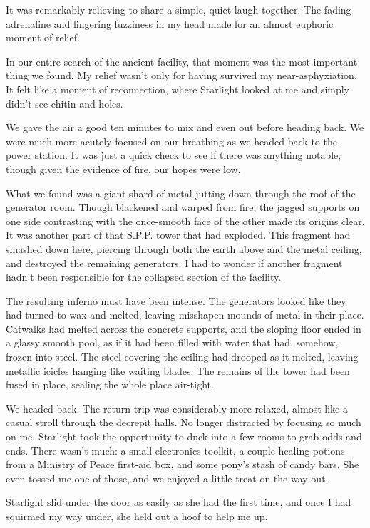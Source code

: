 It was remarkably relieving to share a simple, quiet laugh together. The fading adrenaline and lingering fuzziness in my head made for an almost euphoric moment of relief.

In our entire search of the ancient facility, that moment was the most important thing we found. My relief wasn’t only for having survived my near-asphyxiation. It felt like a moment of reconnection, where Starlight looked at me and simply didn’t see chitin and holes.

We gave the air a good ten minutes to mix and even out before heading back. We were much more acutely focused on our breathing as we headed back to the power station. It was just a quick check to see if there was anything notable, though given the evidence of fire, our hopes were low.

What we found was a giant shard of metal jutting down through the roof of the generator room. Though blackened and warped from fire, the jagged supports on one side contrasting with the once-smooth face of the other made its origins clear. It was another part of that S.P.P. tower that had exploded. This fragment had smashed down here, piercing through both the earth above and the metal ceiling, and destroyed the remaining generators. I had to wonder if another fragment hadn’t been responsible for the collapsed section of the facility.

The resulting inferno must have been intense. The generators looked like they had turned to wax and melted, leaving misshapen mounds of metal in their place. Catwalks had melted across the concrete supports, and the sloping floor ended in a glassy smooth pool, as if it had been filled with water that had, somehow, frozen into steel. The steel covering the ceiling had drooped as it melted, leaving metallic icicles hanging like waiting blades. The remains of the tower had been fused in place, sealing the whole place air-tight.

We headed back. The return trip was considerably more relaxed, almost like a casual stroll through the decrepit halls. No longer distracted by focusing so much on me, Starlight took the opportunity to duck into a few rooms to grab odds and ends. There wasn’t much: a small electronics toolkit, a couple healing potions from a Ministry of Peace first-aid box, and some pony’s stash of candy bars. She even tossed me one of those, and we enjoyed a little treat on the way out.

Starlight slid under the door as easily as she had the first time, and once I had squirmed my way under, she held out a hoof to help me up.

